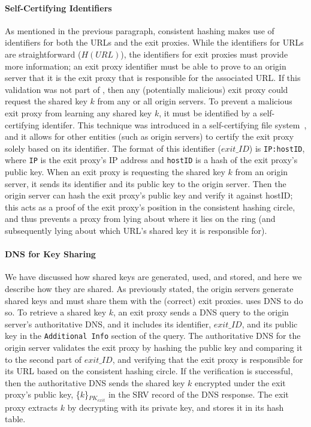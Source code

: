 \paragraph{Self-Certifying Identifiers}
As mentioned in the previous paragraph, consistent hashing makes use of identifiers for both the URLs and 
the exit proxies.  While the identifiers for URLs are straightforward ($H(URL)$), the identifiers for exit 
proxies must provide more information; an exit proxy identifier must be able to prove to an origin server that 
it is the exit proxy that is responsible for the associated URL.  If this validation was not part of \system{}, 
then any (potentially malicious) exit proxy could request the shared key $k$ from any or all origin servers.  To 
prevent a malicious exit proxy from learning any shared key $k$, it must be identified by a self-certifying 
identifer.  This technique was introduced in a self-certifying file system~\cite{mazieres2000self}, and it allows 
for other entities (such as origin servers) to certify the exit proxy solely based on its identifier.  The format 
of this identifier ($exit\_ID$) is {\tt IP:hostID}, where {\tt IP} is the exit proxy's IP address and {\tt hostID} 
is a hash of the exit proxy's public key.  When an exit proxy is requesting the shared key $k$ from an origin server, 
it sends its identifier and its public key to the origin server.  Then the origin server can hash the exit proxy's 
public key and verify it against hostID; this acts as a proof of the exit proxy's position in the consistent hashing 
circle, and thus prevents a proxy from lying about where it lies on the ring (and subsequently lying about which 
URL's shared key it is responsible for).

\paragraph{DNS for Key Sharing}
We have discussed how shared keys are generated, used, and stored, and here we describe how they are shared.  As previously 
stated, the origin servers generate shared keys and must share them with the (correct) exit proxies.  \system{} uses DNS
to do so.  To retrieve a shared key $k$, an exit proxy sends a DNS query to the origin server's authoritative DNS, and 
it includes its identifier, $exit\_ID$, and its public key in the {\tt Additional Info} section of the query.  The 
authoritative DNS for the origin server validates the exit proxy by hashing the public key and comparing it to the 
second part of $exit\_ID$, and verifying that the exit proxy is responsible for its URL based on the consistent 
hashing circle.  If the verification is successful, then the authoritative DNS sends the shared key $k$ encrypted 
under the exit proxy's public key, \{$k$\}$_{PK_{exit}}$ in the SRV record of the DNS response.  The exit proxy 
extracts $k$ by decrypting with its private key, and stores it in its hash table.

